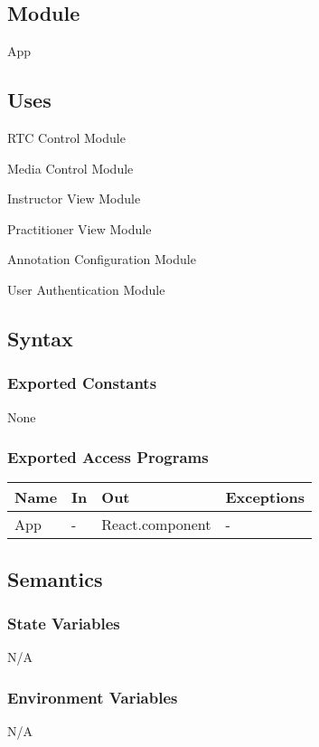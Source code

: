 \documentclass[12pt, titlepage]{article}
\begin{document}
\subsection{Module}
App

\subsection{Uses}
RTC Control Module

Media Control Module

Instructor View Module

Practitioner View Module

Annotation Configuration Module

User Authentication Module

\subsection{Syntax}

\subsubsection{Exported Constants}
None

\subsubsection{Exported Access Programs}
\begin{table}[h!]
  \centering
  \begin{tabular}{llll}
    \hline
    \textbf{Name} & \textbf{In} & \textbf{Out}          & \textbf{Exceptions} \\
    \hline
    App     & -     & React.component & -             \\
    \hline
  \end{tabular}
\end{table}

\subsection{Semantics}

\subsubsection{State Variables}
N/A

\subsubsection{Environment Variables}
N/A
\end{document}
